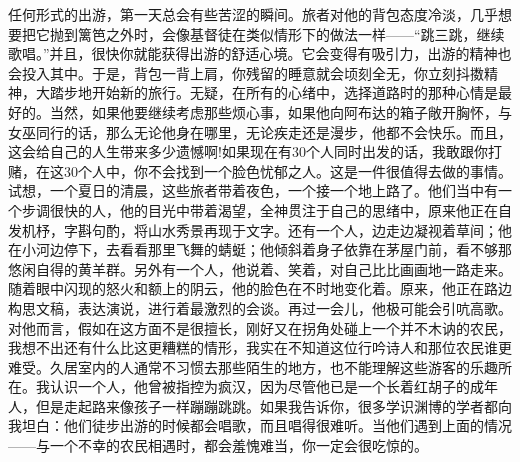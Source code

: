 {任何形式的出游，第一天总会有些苦涩的瞬间。旅者对他的背包态度冷淡，几乎想要把它抛到篱笆之外时，会像基督徒在类似情形下的做法一样——“跳三跳，继续歌唱。”并且，很快你就能获得出游的舒适心境。它会变得有吸引力，出游的精神也会投入其中。于是，背包一背上肩，你残留的睡意就会顷刻全无，你立刻抖擞精神，大踏步地开始新的旅行。无疑，在所有的心绪中，选择道路时的那种心情是最好的。当然，如果他要继续考虑那些烦心事，如果他向阿布达的箱子敞开胸怀，与女巫同行的话，那么无论他身在哪里，无论疾走还是漫步，他都不会快乐。而且，这会给自己的人生带来多少遗憾啊!如果现在有30个人同时出发的话，我敢跟你打赌，在这30个人中，你不会找到一个脸色忧郁之人。这是一件很值得去做的事情。试想，一个夏日的清晨，这些旅者带着夜色，一个接一个地上路了。他们当中有一个步调很快的人，他的目光中带着渴望，全神贯注于自己的思绪中，原来他正在自发机杼，字斟句酌，将山水秀景再现于文字。还有一个人，边走边凝视着草间；他在小河边停下，去看看那里飞舞的蜻蜓；他倾斜着身子依靠在茅屋门前，看不够那悠闲自得的黄羊群。另外有一个人，他说着、笑着，对自己比比画画地一路走来。随着眼中闪现的怒火和额上的阴云，他的脸色在不时地变化着。原来，他正在路边构思文稿，表达演说，进行着最激烈的会谈。再过一会儿，他极可能会引吭高歌。对他而言，假如在这方面不是很擅长，刚好又在拐角处碰上一个并不木讷的农民，我想不出还有什么比这更糟糕的情形，我实在不知道这位行吟诗人和那位农民谁更难受。久居室内的人通常不习惯去那些陌生的地方，也不能理解这些游客的乐趣所在。我认识一个人，他曾被指控为疯汉，因为尽管他已是一个长着红胡子的成年人，但是走起路来像孩子一样蹦蹦跳跳。如果我告诉你，很多学识渊博的学者都向我坦白：他们徒步出游的时候都会唱歌，而且唱得很难听。当他们遇到上面的情况——与一个不幸的农民相遇时，都会羞愧难当，你一定会很吃惊的。
}